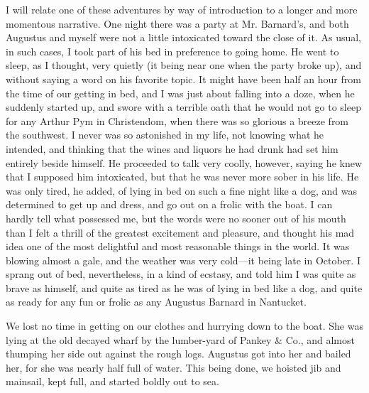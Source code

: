 I will relate one of these adventures by way of introduction to a longer and
more momentous narrative. One night there was a party at Mr. Barnard's, and both
Augustus and myself were not a little intoxicated toward the close of it. As
usual, in such cases, I took part of his bed in preference to going home. He
went to sleep, as I thought, very quietly (it being near one when the party
broke up), and without saying a word on his favorite topic. It might have been
half an hour from the time of our getting in bed, and I was just about falling
into a doze, when he suddenly started up, and swore with a terrible oath that he
would not go to sleep for any Arthur Pym in Christendom, when there was so
glorious a breeze from the southwest. I never was so astonished in my life, not
knowing what he intended, and thinking that the wines and liquors he had drunk
had set him entirely beside himself. He proceeded to talk very coolly, however,
saying he knew that I supposed him intoxicated, but that he was never more sober
in his life. He was only tired, he added, of lying in bed on such a fine night
like a dog, and was determined to get up and dress, and go out on a frolic with
the boat. I can hardly tell what possessed me, but the words were no sooner out
of his mouth than I felt a thrill of the greatest excitement and pleasure, and
thought his mad idea one of the most delightful and most reasonable things in
the world. It was blowing almost a gale, and the weather was very cold---it
being late in October. I sprang out of bed, nevertheless, in a kind of ecstasy,
and told him I was quite as brave as himself, and quite as tired as he was of
lying in bed like a dog, and quite as ready for any fun or frolic as any
Augustus Barnard in Nantucket. 

We lost no time in getting on our clothes and hurrying down to the boat. She
was lying at the old decayed wharf by the lumber-yard of Pankey \& Co., and
almost thumping her side out against the rough logs. Augustus got into her and
bailed her, for she was nearly half full of water. This being done, we hoisted
jib and mainsail, kept full, and started boldly out to sea. 

